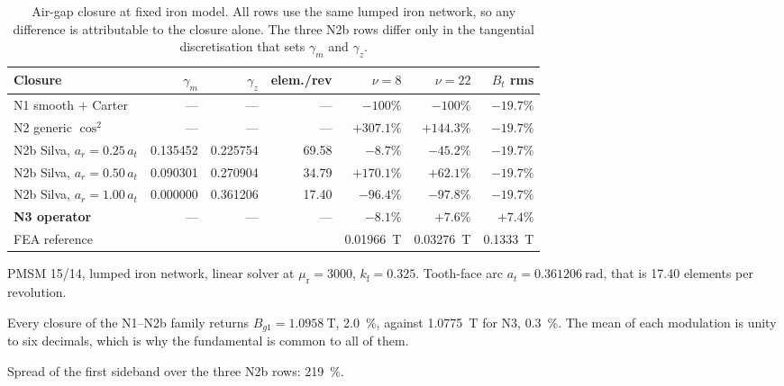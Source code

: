\documentclass[10pt,a4paper,twocolumn]{article}
\theoremstyle{plain}
\theoremstyle{remark}
\begin{document}
\begin{table}[!t]
\centering
\begin{threeparttable}
\footnotesize
\begin{tabular}{@{}lrrrrrr@{}}
\toprule
Closure & $\gamma_m$ & $\gamma_z$ & elem./rev
& $\nu=8$ & $\nu=22$ & $B_t$ rms\\
\midrule
N1 smooth $+$ Carter        & ---      & ---      & ---   & $-100\%$   & $-100\%$  & $-19.7\%$\\
N2 generic $\cos^2$         & ---      & ---      & ---   & $+307.1\%$ & $+144.3\%$& $-19.7\%$\\
N2b Silva, $a_r=0.25\,a_t$  & 0.135452 & 0.225754 & 69.58 & $\bm{-8.7\%}$ & $-45.2\%$ & $-19.7\%$\\
N2b Silva, $a_r=0.50\,a_t$  & 0.090301 & 0.270904 & 34.79 & $+170.1\%$ & $+62.1\%$ & $-19.7\%$\\
N2b Silva, $a_r=1.00\,a_t$  & 0.000000 & 0.361206 & 17.40 & $-96.4\%$  & $-97.8\%$ & $-19.7\%$\\
\textbf{N3 operator}        & ---      & ---      & ---   & $\bm{-8.1\%}$ & $+7.6\%$ & $\bm{+7.4\%}$\\
\midrule
FEA reference & \multicolumn{3}{l}{}
& \SI{0.01966}{\tesla} & \SI{0.03276}{\tesla} & \SI{0.1333}{\tesla}\\
\bottomrule
\end{tabular}
\begin{tablenotes}[flushleft]\footnotesize
\item PMSM 15/14, lumped iron network, linear
solver at $\mu_{\mathrm{r}}=\num{3000}$, $k_{\mathrm{f}}=\num{0.325}$.
Tooth-face arc $a_t=\SI{0.361206}{\radian}$, that is
\num{17.40} elements per revolution.
\item Every closure of the N1--N2b family returns
$B_{g1}=\SI{1.0958}{\tesla}$, \SI{+2.0}{\percent}, against
\SI{1.0775}{\tesla} for N3, \SI{+0.3}{\percent}. The mean of each
modulation is unity to six decimals, which is why the fundamental is
common to all of them.
\item Spread of the first sideband over the three N2b rows:
\SI{219}{\percent}.
\end{tablenotes}
\end{threeparttable}
\caption{Air-gap closure at fixed iron model. All rows use the same
lumped iron network, so any difference is attributable to the closure
alone. The three N2b rows differ only in the tangential discretisation
that sets $\gamma_m$ and $\gamma_z$.}
\label{tab:carter}
\end{table}
\end{document}
